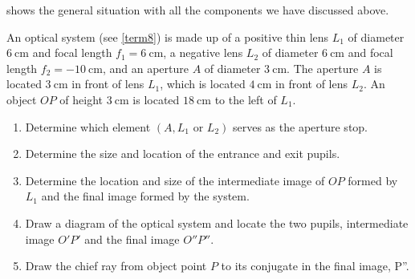 \documentclass[english,a4paper,12pt]{report}
\begin{document}

 shows the general situation with all the components we have discussed above.


{An optical system (see \cref{term8}) is made up of a positive thin lens \(L_{1} \) of diameter \(\SI{6}{\cm} \) and focal length \(f_1 = \SI{6}{\cm} \), a negative lens \(L_2 \) of diameter \(\SI{6}{\cm} \) and focal length \(f_2 = -\SI{10}{\cm} \), and an aperture \(A\) of diameter \(\SI{3}{\cm} \). The aperture \(A\) is located \(\SI{3}{\cm} \) in front of lens \(L_1 \), which is located \(\SI{4}{\cm} \) in front of lens \(L_2 \). An object \(OP\) of height \(\SI{3}{\cm} \) is located \(\SI{18}{\cm} \) to the left of \(L_1 \). 

\begin{enumerate}
    \item Determine which element \((A,L_1 \text { or } L_2 )\) serves as the aperture stop.
    \item Determine the size and location of the entrance and exit pupils.
    \item Determine the location and size of the intermediate image of \(OP\) formed by \(L_1 \) and the final image formed by the system.
    \item Draw a diagram of the optical system and locate the two pupils, intermediate image \(O'P'\) and the final image \(O''P''\).
    \item Draw the chief ray from object point \(P\) to its conjugate in the final image, P''.   
\end{enumerate}
~
}
\end{document}
